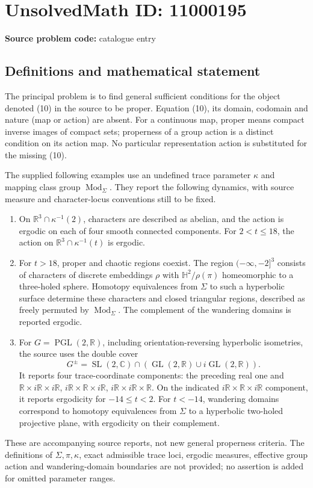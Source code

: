\documentclass[11pt]{article}
\newcommand{\R}{\mathbb{R}}
\newcommand{\C}{\mathbb{C}}
\begin{document}
\section*{UnsolvedMath ID: 11000195}
\textbf{Source problem code:} catalogue entry
\subsection{Definitions and mathematical statement}
The principal problem is to find general sufficient conditions for the object denoted (10) in the source to be proper. Equation (10), its domain, codomain and nature (map or action) are absent. For a continuous map, proper means compact inverse images of compact sets; properness of a group action is a distinct condition on its action map. No particular representation action is substituted for the missing (10).

The supplied following examples use an undefined trace parameter \(\kappa\) and mapping class group \(\operatorname{Mod}_\Sigma\). They report the following dynamics, with source measure and character-locus conventions still to be fixed.
\begin{enumerate}
\item On \(\R^3\cap\kappa^{-1}(2)\), characters are described as abelian, and the action is ergodic on each of four smooth connected components. For \(2<t\leq18\), the action on \(\R^3\cap\kappa^{-1}(t)\) is ergodic.
\item For \(t>18\), proper and chaotic regions coexist. The region \(( -\infty,-2]^3\) consists of characters of discrete embeddings \(\rho\) with \(\mathbb H^2/\rho(\pi)\) homeomorphic to a three-holed sphere. Homotopy equivalences from \(\Sigma\) to such a hyperbolic surface determine these characters and closed triangular regions, described as freely permuted by \(\operatorname{Mod}_\Sigma\). The complement of the wandering domains is reported ergodic.
\item For \(G=\operatorname{PGL}(2,\R)\), including orientation-reversing hyperbolic isometries, the source uses the double cover
\[
 G^\pm=\operatorname{SL}(2,\C)\cap
       (\operatorname{GL}(2,\R)\cup i\operatorname{GL}(2,\R)).
\]
It reports four trace-coordinate components: the preceding real one and
\(\R\times i\R\times i\R\), \(i\R\times\R\times i\R\),
\(i\R\times i\R\times\R\).
On the indicated \(i\R\times\R\times i\R\) component, it reports ergodicity for \(-14\leq t<2\). For \(t<-14\), wandering domains correspond to homotopy equivalences from \(\Sigma\) to a hyperbolic two-holed projective plane, with ergodicity on their complement.
\end{enumerate}
These are accompanying source reports, not new general properness criteria. The definitions of \(\Sigma,\pi,\kappa\), exact admissible trace loci, ergodic measures, effective group action and wandering-domain boundaries are not provided; no assertion is added for omitted parameter ranges.
\end{document}
